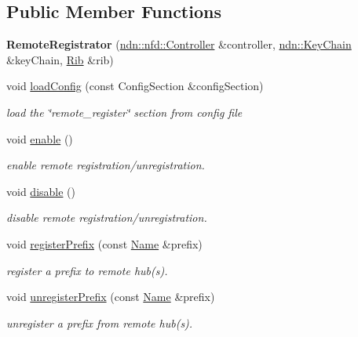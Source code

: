 \subsection*{Public Member Functions}
\begin{DoxyCompactItemize}
\item 
{\bfseries Remote\+Registrator} (\hyperlink{classndn_1_1nfd_1_1Controller}{ndn\+::nfd\+::\+Controller} \&controller, \hyperlink{classndn_1_1security_1_1KeyChain}{ndn\+::\+Key\+Chain} \&key\+Chain, \hyperlink{classnfd_1_1rib_1_1Rib}{Rib} \&rib)\hypertarget{classnfd_1_1rib_1_1RemoteRegistrator_a3e7c3dc0a1fe541e546b00e46fba1f07}{}\label{classnfd_1_1rib_1_1RemoteRegistrator_a3e7c3dc0a1fe541e546b00e46fba1f07}

\item 
void \hyperlink{classnfd_1_1rib_1_1RemoteRegistrator_a37abdf462a205cc4b96bef1176792b24}{load\+Config} (const Config\+Section \&config\+Section)
\begin{DoxyCompactList}\small\item\em load the \char`\"{}remote\+\_\+register\char`\"{} section from config file \end{DoxyCompactList}\item 
void \hyperlink{classnfd_1_1rib_1_1RemoteRegistrator_a165a6b29d840deffe0e2b893488a65ec}{enable} ()\hypertarget{classnfd_1_1rib_1_1RemoteRegistrator_a165a6b29d840deffe0e2b893488a65ec}{}\label{classnfd_1_1rib_1_1RemoteRegistrator_a165a6b29d840deffe0e2b893488a65ec}

\begin{DoxyCompactList}\small\item\em enable remote registration/unregistration. \end{DoxyCompactList}\item 
void \hyperlink{classnfd_1_1rib_1_1RemoteRegistrator_a63d4562fc276c40b71a879e35a9c773a}{disable} ()\hypertarget{classnfd_1_1rib_1_1RemoteRegistrator_a63d4562fc276c40b71a879e35a9c773a}{}\label{classnfd_1_1rib_1_1RemoteRegistrator_a63d4562fc276c40b71a879e35a9c773a}

\begin{DoxyCompactList}\small\item\em disable remote registration/unregistration. \end{DoxyCompactList}\item 
void \hyperlink{classnfd_1_1rib_1_1RemoteRegistrator_a3c96aa573f8e88b65ad7e4ebd47294c1}{register\+Prefix} (const \hyperlink{classndn_1_1Name}{Name} \&prefix)
\begin{DoxyCompactList}\small\item\em register a prefix to remote hub(s). \end{DoxyCompactList}\item 
void \hyperlink{classnfd_1_1rib_1_1RemoteRegistrator_a45ecb98ad8ceb7a38b5c946f504adc0b}{unregister\+Prefix} (const \hyperlink{classndn_1_1Name}{Name} \&prefix)
\begin{DoxyCompactList}\small\item\em unregister a prefix from remote hub(s). \end{DoxyCompactList}\end{DoxyCompactItemize}


